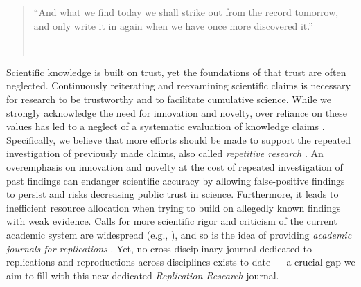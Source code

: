 \documentclass[11pt,a4paper]{article}
\newlength{\FooterYShift}\setlength{\FooterYShift}{-14pt}
\newlength{\HeaderLeftDelta}\setlength{\HeaderLeftDelta}{0mm}
\newlength{\FooterRightDelta}\setlength{\FooterRightDelta}{0mm}
\begin{document}
\newpage


\pagestyle{mainstyle}
\thispagestyle{mainstyle}


\begin{quote}
``And what we find today we shall strike out from the record tomorrow,
and only write it in again when we have once more discovered it.''

--- \autocite{Brecht1974-gk}
\end{quote}

Scientific knowledge is built on trust, yet the foundations of that
trust are often neglected. Continuously reiterating and reexamining
scientific claims is necessary for research to be trustworthy and to
facilitate cumulative science. While we strongly acknowledge the need
for innovation and novelty, over reliance on these values has led to a
neglect of a systematic evaluation of knowledge claims
\autocite{Makel2012ReplicationsPsychology}. Specifically, we believe
that more efforts should be made to support the repeated investigation
of previously made claims, also called \emph{repetitive research}
\autocite{Schoech2023RepetitiveResearch}. An overemphasis on innovation
and novelty at the cost of repeated investigation of past findings can
endanger scientific accuracy by allowing false-positive findings to
persist and risks decreasing public trust in science. Furthermore, it
leads to inefficient resource allocation when trying to build on
allegedly known findings with weak evidence. Calls for more scientific
rigor and criticism of the current academic system are widespread (e.g.,
\autocite{king1995replication,Munafo2017ManifestoReproducibleScience}),
and so is the idea of providing \emph{academic journals for
replications} \autocite{Grunow2018LackReproducibility}. Yet, no
cross-disciplinary journal dedicated to replications and reproductions
across disciplines exists to date --- a crucial gap we aim to fill with
this new dedicated \emph{Replication Research} journal.
\end{document}

